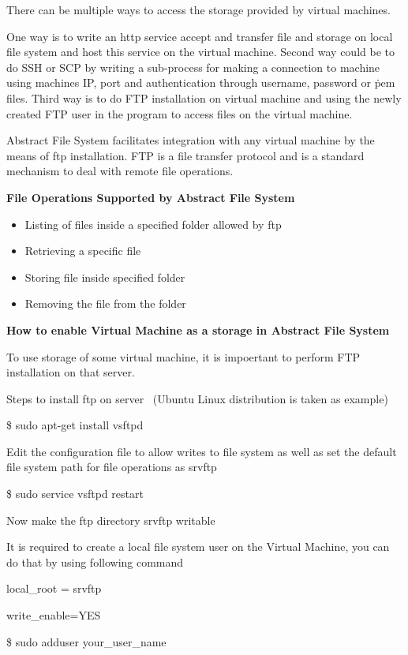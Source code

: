 There can be multiple ways to access the storage provided by virtual machines. 

One way is to write an http service accept and transfer file and storage on 
local file system and host this service on the virtual machine. Second way 
could be to do SSH or SCP by writing a sub-process for making a connection to 
machine using machines IP, port and authentication through username, 
password or \.pem files. Third way is to do FTP installation on virtual 
machine and using the newly created FTP user in the program to access files on 
the virtual machine.


Abstract File System facilitates integration with any virtual machine by the 
means of ftp installation. FTP is a file transfer protocol and is a standard 
mechanism to deal with remote file operations.


\textbf{File Operations Supported by Abstract File System }
\begin{itemize}
    \item  Listing of files inside a specified folder allowed by ftp
    \item  Retrieving a specific file 
    \item  Storing file inside specified folder
    \item  Removing the file from the folder
\end{itemize}   

\textbf{How to enable Virtual Machine as a storage in Abstract File System}

To use storage of some virtual machine, it is impoertant to perform 
FTP installation on that server. 

Steps to install ftp on server~\cite{hid-sp18-420-FTP}
(Ubuntu Linux distribution is taken as example)


\$ sudo apt-get install vsftpd


Edit the configuration file to allow writes to file system as well as set the 
default file system path for file operations as \/srv\/ftp


\$ sudo service vsftpd restart


Now make the ftp directory \/srv\/ftp writable 


It is required to create a local file system user on the Virtual Machine, you 
can do that by using following command

	
local\_root = \/srv\/ftp  


write\_enable=YES       


\$ sudo adduser your\_user\_name    


